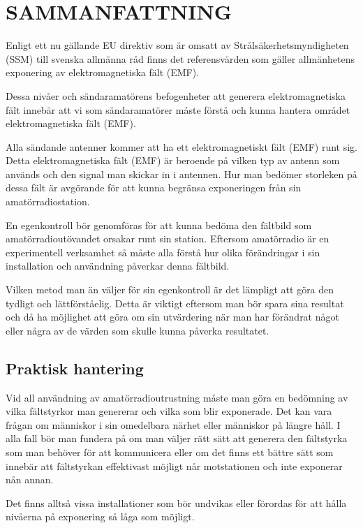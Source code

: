 \section{SAMMANFATTNING}

Enligt ett nu gällande EU direktiv som är omsatt av
Strålsäkerhetsmyndigheten (SSM) till svenska allmänna råd finns det
referensvärden som gäller allmänhetens exponering av elektromagnetiska
fält (EMF).

Dessa nivåer och sändaramatörens befogenheter att generera
elektromagnetiska fält innebär att vi som sändaramatörer måste förstå
och kunna hantera området elektromagnetiska fält (EMF).

Alla sändande antenner kommer att ha ett elektromagnetiskt fält (EMF)
runt sig. Detta elektromagnetiska fält (EMF) är beroende på vilken
typ av antenn som används och den signal man skickar in i antennen.
Hur man bedömer storleken på dessa fält är avgörande för att kunna
begränsa exponeringen från sin amatörradiostation.

En egenkontroll bör genomföras för att kunna bedöma den fältbild som
amatörradioutövandet orsakar runt sin station. Eftersom amatörradio
är en experimentell verksamhet så måste alla förstå hur olika
förändringar i sin installation och användning påverkar denna fältbild.

Vilken metod man än väljer för sin egenkontroll är det lämpligt att
göra den tydligt och lättförståelig. Detta är viktigt eftersom man
bör spara sina resultat och då ha möjlighet att göra om sin utvärdering
när man har förändrat något eller några av de värden som skulle kunna
påverka resultatet.

\subsection{Praktisk hantering}

Vid all användning av amatörradioutrustning måste man göra en bedömning
av vilka fältstyrkor man genererar och vilka som blir exponerade. Det
kan vara frågan om människor i sin omedelbara närhet eller människor
på längre håll. I alla fall bör man fundera på om man väljer rätt sätt
att generera den fältstyrka som man behöver för att kommunicera eller
om det finns ett bättre sätt som innebär att fältstyrkan effektivast
möjligt når motstationen och inte exponerar nån annan.

Det finns alltså vissa installationer som bör undvikas eller förordas
för att hålla nivåerna på exponering så låga som möjligt.

